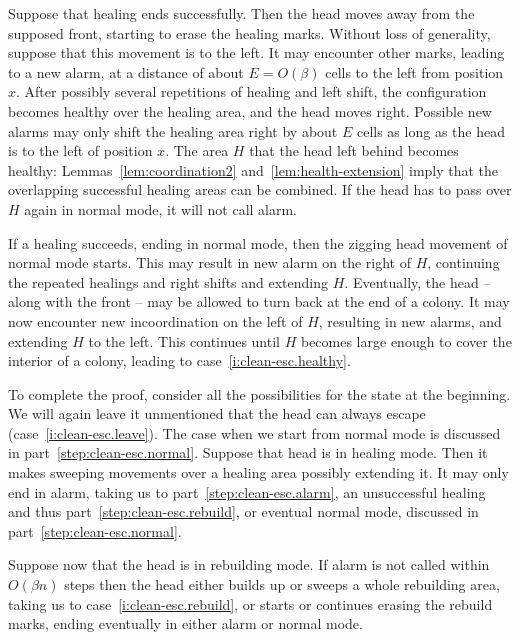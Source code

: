 \documentclass[12pt]{memoir}
\newcommand{\E}{E}
\begin{document}
\begin{Proof}
\begin{pproof}
Suppose that healing ends successfully.
Then the head moves away from the supposed front, starting to erase the healing marks.
Without loss of generality, suppose that this movement is to the left.
It may encounter other marks, leading to a new alarm, at a distance of 
about \( \E=O(\beta)  \) cells to the left from position \( x \).
After possibly several repetitions of healing and left shift,
the configuration becomes healthy over the healing area, and the head moves right.
Possible new alarms may only shift the healing area right by about \( \E \) cells
as long as the head is to the left of position \( x \).
The area \( H \) that the head left behind becomes healthy:
Lemmas~\ref{lem:coordination2} and~\ref{lem:health-extension} imply that 
the overlapping successful healing areas can be combined.
If the head has to pass over \( H \) again in normal mode, it will not call alarm.

If a healing succeeds, ending in normal mode, then the zigging head movement
of normal mode starts.
This may result in new alarm on the right of \( H \), continuing the 
repeated healings and right shifts and extending \( H \).
Eventually, the head -- along with the front -- 
may be allowed to turn back at the end of a colony.
It may now encounter new incoordination on the left of \( H \), resulting in new
alarms, and extending \( H \) to the left.
This continues until \( H \) becomes large enough to cover the interior of a colony,
leading to case~\eqref{i:clean-esc.healthy}.
\end{pproof} %

To complete the proof, consider all the possibilities for the state at the beginning.
We will again leave it unmentioned that the head can always escape (case~\eqref{i:clean-esc.leave}).
The case when we start from normal mode is discussed in part~\ref{step:clean-esc.normal}.
Suppose that head is in healing mode.
Then it makes sweeping movements over a healing area possibly extending it.
It may only end in alarm, taking us to part~\ref{step:clean-esc.alarm},
an unsuccessful healing and thus part~\ref{step:clean-esc.rebuild}, or eventual normal mode,
discussed in part~\ref{step:clean-esc.normal}.

Suppose now that the head is in rebuilding mode.
If alarm is not called within \( O(\beta n) \) steps then the head either builds up or sweeps
a whole rebuilding area, taking us to case~\eqref{i:clean-esc.rebuild},
or starts or continues erasing the rebuild marks, ending eventually in either
alarm or normal mode.
\end{Proof}
\end{document}
